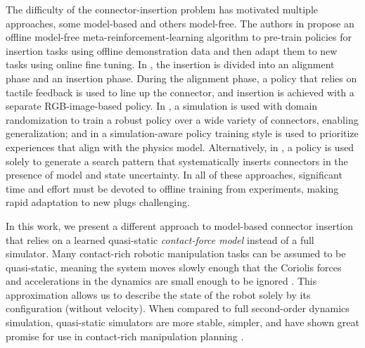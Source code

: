 The difficulty of the connector-insertion problem has motivated multiple approaches, some model-based and others model-free. The authors in \cite{zhao2022} propose an offline model-free meta-reinforcement-learning algorithm to pre-train policies for insertion tasks using offline demonstration data and then adapt them to new tasks using online fine tuning. In \cite{fu2023}, the insertion is divided into an alignment phase and an insertion phase. During the alignment phase, a policy that relies on tactile feedback is used to line up the connector, and insertion is achieved with a separate RGB-image-based policy. In \cite{nair2023}, a simulation is used with domain randomization to train a robust policy over a wide variety of connectors, enabling generalization; and in \cite{tang2023} a simulation-aware policy training style is used to prioritize experiences that align with the physics model. Alternatively, in \cite{kang2022}, a policy is used solely to generate a search pattern that systematically inserts connectors in the presence of model and state uncertainty. In all of these approaches, significant time and effort must be devoted to offline training from experiments, making rapid adaptation to new plugs challenging.

In this work, we present a different approach to model-based connector insertion that relies on a learned quasi-static \textit{contact-force model} instead of a full simulator.  Many contact-rich robotic manipulation tasks can be assumed to be quasi-static, meaning the system moves slowly enough that the Coriolis forces and accelerations in the dynamics are small enough to be ignored \citep{mason2001a, halm2019}. This approximation allows us to describe the state of the robot solely by its configuration (without velocity).  When compared to full second-order dynamics simulation, quasi-static simulators are more stable, simpler, and have shown great promise for use in contact-rich manipulation planning \citep{pang2023,suh2020}.

